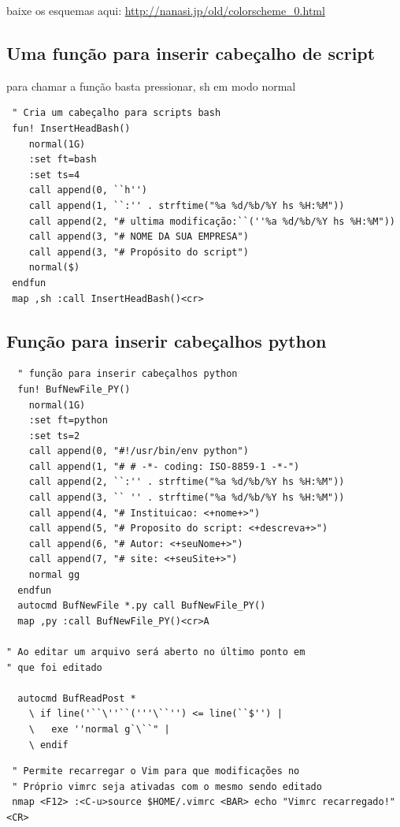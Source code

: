 \documentclass[10pt,a4paper,openany]{book}
\begin{document}
baixe os esquemas aqui:
\url{http://nanasi.jp/old/colorscheme_0.html}

\subsection{Uma função para inserir cabeçalho de script}
\label{Uma função para inserir cabeçalho de script bash}
para chamar a função
basta pressionar, sh em modo normal

\begin{verbatim}
 " Cria um cabeçalho para scripts bash
 fun! InsertHeadBash()
    normal(1G)
    :set ft=bash
    :set ts=4
    call append(0, ``h'')
    call append(1, ``:'' . strftime("%a %d/%b/%Y hs %H:%M"))
    call append(2, "# ultima modificação:``(''%a %d/%b/%Y hs %H:%M"))
    call append(3, "# NOME DA SUA EMPRESA")
    call append(3, "# Propósito do script")
    normal($)
 endfun
 map ,sh :call InsertHeadBash()<cr>
\end{verbatim}

\subsection{Função para inserir cabeçalhos python}
\label{Função para inserir cabeçalhos python}

\begin{verbatim}
  " função para inserir cabeçalhos python
  fun! BufNewFile_PY()
  	normal(1G)
  	:set ft=python
  	:set ts=2
  	call append(0, "#!/usr/bin/env python")
  	call append(1, "# # -*- coding: ISO-8859-1 -*-")
  	call append(2, ``:'' . strftime("%a %d/%b/%Y hs %H:%M"))
  	call append(3, `` '' . strftime("%a %d/%b/%Y hs %H:%M"))
  	call append(4, "# Instituicao: <+nome+>")
  	call append(5, "# Proposito do script: <+descreva+>")
  	call append(6, "# Autor: <+seuNome+>")
  	call append(7, "# site: <+seuSite+>")
  	normal gg
  endfun
  autocmd BufNewFile *.py call BufNewFile_PY()
  map ,py :call BufNewFile_PY()<cr>A

" Ao editar um arquivo será aberto no último ponto em
" que foi editado

  autocmd BufReadPost *
    \ if line('``\''``('''\``'') <= line(``$'') |
    \   exe ''normal g`\``" |
    \ endif
\end{verbatim}

\begin{verbatim}
 " Permite recarregar o Vim para que modificações no
 " Próprio vimrc seja ativadas com o mesmo sendo editado
 nmap <F12> :<C-u>source $HOME/.vimrc <BAR> echo "Vimrc recarregado!"<CR>
\end{verbatim}
\end{document}
